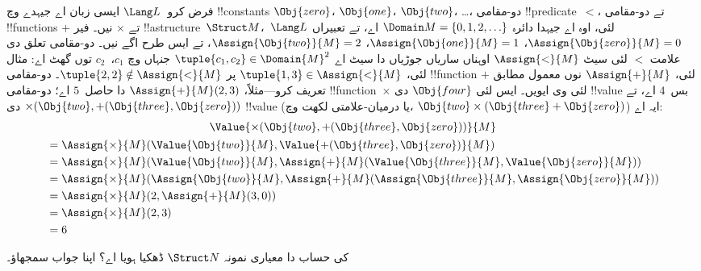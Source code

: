 \documentclass[../../../include/open-logic-section]{subfiles}
\begin{document}
\begin{ex}
فرض کرو~$\Lang L$ ایسی زبان اے جیہدے وچ !!{constant}s
$\Obj{zero}$، $\Obj{one}$، $\Obj{two}$، \dots، دو-مقامی
!!{predicate}~$<$، تے دو-مقامی !!{function}s $+$ تے $\times$
نیں۔ فیر !!a{structure}~$\Struct
M$،~$\Lang L$ لئی، اوہ اے جیہدا دائرہ $\Domain M = \{0, 1, 2, \ldots
\}$ اے، تے تعبیراں $\Assign{\Obj{zero}}{M} = 0$،
$\Assign{\Obj{one}}{M} = 1$، $\Assign{\Obj{two}}{M} = 2$،
تے ایس طرح اگے نیں۔ دو-مقامی تعلق دی علامت $<$ لئی سیٹ
$\Assign{<}{M}$ اوہناں ساریاں جوڑیاں دا سیٹ اے
$\tuple{c_1, c_2} \in \Domain{M}^2$ جنہاں وچ
$c_1$،~$c_2$ توں گھٹ اے: مثال لئی، $\tuple{1, 3} \in
\Assign{<}{M}$ پر $\tuple{2, 2} \notin \Assign{<}{M}$۔
دو-مقامی !!{function} $+$ لئی، $\Assign{+}{M}$ نوں معمول
مطابق تعریف کرو---مثلاً، $\Assign{+}{M}(2,3)$ دا حاصل~$5$
اے؛ دو-مقامی !!{function}~$\times$ لئی وی ایویں۔ ایس لئی
$\Obj{four}$ دی !!{value} بس~$4$ اے، تے
$\times(\Obj{two},
+(\Obj{three},\Obj{zero}))$ دی !!{value} (یا درمیان-علامتی
لکھت وچ، $\Obj{two} \times
(\Obj{three} + \Obj{zero})$) ایہ اے:
\begin{multline*}
\Value{\times(\Obj{two}, +(\Obj{three},\Obj{zero}))}{M} \\
\begin{aligned}
& =\Assign{\times}{M}(\Value{\Obj{two}}{M}, \Value{+(\Obj{three}, \Obj{zero})}{M})\\
& = \Assign{\times}{M}(\Value{\Obj{two}}{M}, \Assign{+}{M}(\Value{\Obj{three}}{M},
\Value{\Obj{zero}}{M})) \\
& = \Assign{\times}{M}(\Assign{\Obj{two}}{M}, \Assign{+}{M}(\Assign{\Obj{three}}{M},
\Assign{\Obj{zero}}{M})) \\
& = \Assign{\times}{M}(2, \Assign{+}{M}(3, 0)) \\
& = \Assign{\times}{M}(2, 3) \\
& = 6
\end{aligned}
\end{multline*}
\end{ex}

\begin{prob}
کی حساب دا معیاری نمونہ $\Struct N$ ڈھکیا ہویا اے؟
اپنا جواب سمجھاؤ۔
\end{prob}
\end{document}
